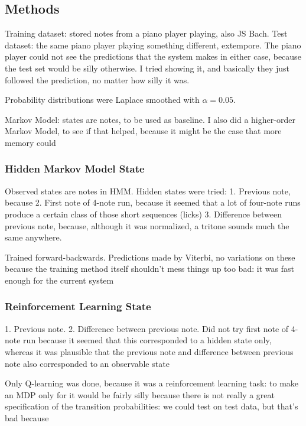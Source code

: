 \documentclass{article}
\begin{document}
\subsection*{Methods}
Training dataset: stored notes from a piano player playing, also JS Bach.
Test dataset: the same piano player playing something different, extempore.
The piano player could not see the predictions that the system makes in either case, because the test set would be silly otherwise. I tried showing it, and basically they just followed the prediction, no matter how silly it was.

Probability distributions were Laplace smoothed with $\alpha = 0.05$.

Markov Model: states are notes, to be used as baseline. I also did a higher-order Markov Model, to see if that helped, because it might be the case that more memory could 

\subsubsection*{Hidden Markov Model State}
Observed states are notes in HMM.
Hidden states were tried:
1. Previous note, because %
2. First note of 4-note run, because it seemed that a lot of four-note runs produce a certain class of those short sequences (licks)
3. Difference between previous note, because, although it was normalized, a tritone sounds much the same anywhere.

Trained forward-backwards. Predictions made by Viterbi, no variations on these because the training method itself shouldn't mess things up too bad: it was fast enough for the current system

\subsubsection*{Reinforcement Learning State}
1. Previous note.
2. Difference between previous note.
Did not try first note of 4-note run because it seemed that this corresponded to a hidden state only, whereas it was plausible that the previous note and difference between previous note also corresponded to an observable state

Only Q-learning was done, because it was a reinforcement learning task: to make an MDP only for it would be fairly silly because there is not really a great specification of the transition probabilities: we could test on test data, but that's bad because %
\end{document}
